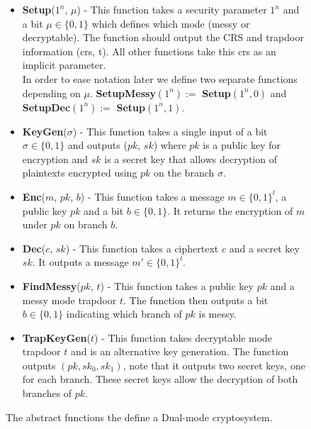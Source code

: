 \documentclass[ %
                    author={Nicholas Tutte},
                supervisor={Prof. Nigel Smart},
                    degree={MEng},
                     title={Secure Two Party Computation},
                  subtitle={A practical comparison of recent protocols},
                      type={Research - GG1K},
                      year={2015} ]{dissertation}
\begin{document}
					\begin{figure}[!htb]
						\begin{mdframed}
							\centering
							\begin{itemize}
								\item \textbf{Setup}($1^n$, $\mu$) - This function takes a security parameter $1^n$ and a bit $\mu \in \{0, 1\}$ which defines which mode (messy or decryptable). The function should output the CRS and trapdoor information (crs, t). All other functions take this crs as an implicit parameter.\\[0.25cm]

								In order to ease notation later we define two separate functions depending on $\mu$. \textbf{SetupMessy}$(1^n) :=$ \textbf{Setup}$(1^n, 0)$ and \textbf{SetupDec}$(1^n) :=$ \textbf{Setup}$(1^n, 1)$.\\[0.25cm]


								\item \textbf{KeyGen}($\sigma$) - This function takes a single input of a bit $\sigma \in \{0, 1\}$ and outputs ($pk$, $sk$) where $pk$ is a public key for encryption and $sk$ is a secret key that allows decryption of plaintexts encrypted using $pk$ on the branch $\sigma$.

								\item \textbf{Enc}($m$, $pk$, $b$) - This function takes a message $m \in \{0, 1\}^l$, a public key $pk$ and a bit $b \in \{0, 1\}$. It returns the encryption of $m$ under $pk$ on branch $b$.

								\item \textbf{Dec}($c$, $sk$) - This function takes a ciphertext $c$ and a secret key $sk$. It outputs a message $m' \in \{0, 1\}^l$.

								\item \textbf{FindMessy}($pk$, $t$) - This function takes a public key $pk$ and a messy mode trapdoor $t$. The function then outputs a bit $b \in \{0, 1\}$ indicating which branch of $pk$ is messy.

								\item \textbf{TrapKeyGen}($t$) - This function takes decryptable mode trapdoor $t$ and is an alternative key generation. The function outputs $(pk, sk_0, sk_1)$, note that it outputs two secret keys, one for each branch. These secret keys allow the decryption of both branches of $pk$.
							\end{itemize}
						\end{mdframed}

						\caption{The abstract functions the define a Dual-mode cryptosystem. \label{fig:PVW_Abstract_Functions}}
					\end{figure}
\end{document}
